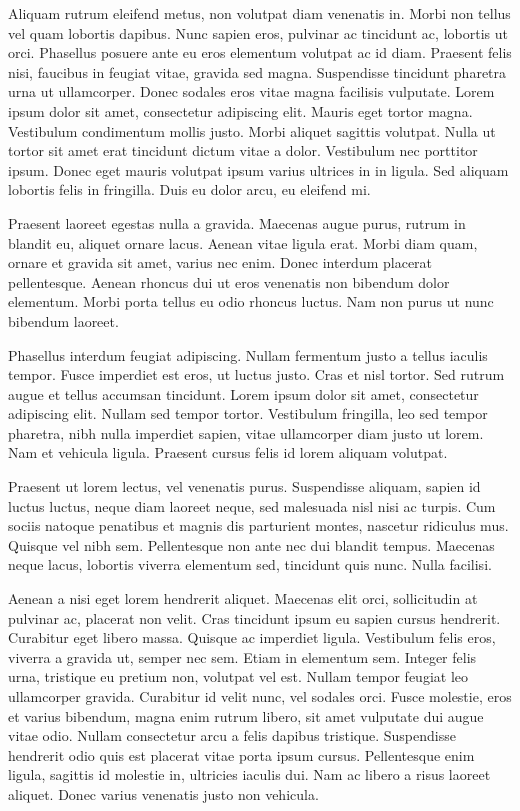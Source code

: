 \documentclass[a4paper]{article}
\begin{document}
Aliquam rutrum eleifend metus, non volutpat diam venenatis in. Morbi non tellus vel quam lobortis dapibus. Nunc sapien eros, pulvinar ac tincidunt ac, lobortis ut orci. Phasellus posuere ante eu eros elementum volutpat ac id diam. Praesent felis nisi, faucibus in feugiat vitae, gravida sed magna. Suspendisse tincidunt pharetra urna ut ullamcorper. Donec sodales eros vitae magna facilisis vulputate. Lorem ipsum dolor sit amet, consectetur adipiscing elit. Mauris eget tortor magna. Vestibulum condimentum mollis justo. Morbi aliquet sagittis volutpat. Nulla ut tortor sit amet erat tincidunt dictum vitae a dolor. Vestibulum nec porttitor ipsum. Donec eget mauris volutpat ipsum varius ultrices in in ligula. Sed aliquam lobortis felis in fringilla. Duis eu dolor arcu, eu eleifend mi.

Praesent laoreet egestas nulla a gravida. Maecenas augue purus, rutrum in blandit eu, aliquet ornare lacus. Aenean vitae ligula erat. Morbi diam quam, ornare et gravida sit amet, varius nec enim. Donec interdum placerat pellentesque. Aenean rhoncus dui ut eros venenatis non bibendum dolor elementum. Morbi porta tellus eu odio rhoncus luctus. Nam non purus ut nunc bibendum laoreet.

Phasellus interdum feugiat adipiscing. Nullam fermentum justo a tellus iaculis tempor. Fusce imperdiet est eros, ut luctus justo. Cras et nisl tortor. Sed rutrum augue et tellus accumsan tincidunt. Lorem ipsum dolor sit amet, consectetur adipiscing elit. Nullam sed tempor tortor. Vestibulum fringilla, leo sed tempor pharetra, nibh nulla imperdiet sapien, vitae ullamcorper diam justo ut lorem. Nam et vehicula ligula. Praesent cursus felis id lorem aliquam volutpat.

Praesent ut lorem lectus, vel venenatis purus. Suspendisse aliquam, sapien id luctus luctus, neque diam laoreet neque, sed malesuada nisl nisi ac turpis. Cum sociis natoque penatibus et magnis dis parturient montes, nascetur ridiculus mus. Quisque vel nibh sem. Pellentesque non ante nec dui blandit tempus. Maecenas neque lacus, lobortis viverra elementum sed, tincidunt quis nunc. Nulla facilisi.

Aenean a nisi eget lorem hendrerit aliquet. Maecenas elit orci, sollicitudin at pulvinar ac, placerat non velit. Cras tincidunt ipsum eu sapien cursus hendrerit. Curabitur eget libero massa. Quisque ac imperdiet ligula. Vestibulum felis eros, viverra a gravida ut, semper nec sem. Etiam in elementum sem. Integer felis urna, tristique eu pretium non, volutpat vel est. Nullam tempor feugiat leo ullamcorper gravida. Curabitur id velit nunc, vel sodales orci. Fusce molestie, eros et varius bibendum, magna enim rutrum libero, sit amet vulputate dui augue vitae odio. Nullam consectetur arcu a felis dapibus tristique. Suspendisse hendrerit odio quis est placerat vitae porta ipsum cursus. Pellentesque enim ligula, sagittis id molestie in, ultricies iaculis dui. Nam ac libero a risus laoreet aliquet. Donec varius venenatis justo non vehicula.
\end{document}
